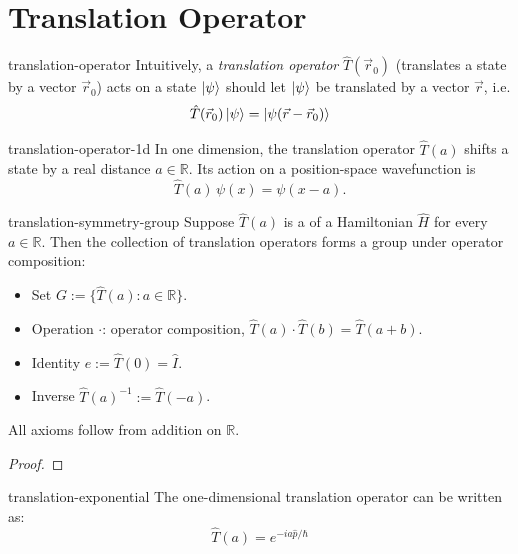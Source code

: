 \documentclass[12pt]{article}
\begin{document}
\section{Translation Operator}

\begin{dfn}{translation-operator}
  Intuitively, a \emph{translation operator} $\hat{T}(\vec{r}_0)$ (translates a state by a vector $\vec{r}_0$) acts on a state $\ket{\psi}$ should let $\ket{\psi}$ be translated by a vector $\vec{r}$, i.e.
  \[\hat{T}(\vec{r}_0)\ket{\psi} = \ket{\psi(\vec{r} - \vec{r}_0)}\]
\end{dfn}

\begin{dfn}{translation-operator-1d}
  In one dimension, the translation operator $\hat{T}(a)$ shifts a state by a real distance $a \in \mathbb{R}$. Its action on a position-space wavefunction is
  \[
    \hat{T}(a)\,\psi(x) = \psi(x - a).
  \]
\end{dfn}

\begin{thm}{translation-symmetry-group}
  Suppose $\hat{T}(a)$ is a  of a Hamiltonian $\hat{H}$ for every $a \in \mathbb{R}$. Then the collection of translation operators forms a group under operator composition:
  \begin{itemize}[nosep]
    \item Set $G := \{\hat{T}(a) : a \in \mathbb{R}\}$.
    \item Operation $\cdot$: operator composition, $\hat{T}(a) \cdot \hat{T}(b) = \hat{T}(a+b)$.
    \item Identity $e := \hat{T}(0) = \hat{I}$.
    \item Inverse $\hat{T}(a)^{-1} := \hat{T}(-a)$.
  \end{itemize}
  All axioms follow from addition on $\mathbb{R}$.
\end{thm}

\begin{proof}

\end{proof}

\begin{thm}{translation-exponential}
  The one-dimensional translation operator can be written as:
  \[\hat{T}(a) = e^{-i a \hat{p}/\hbar}\]
\end{thm}
\end{document}
